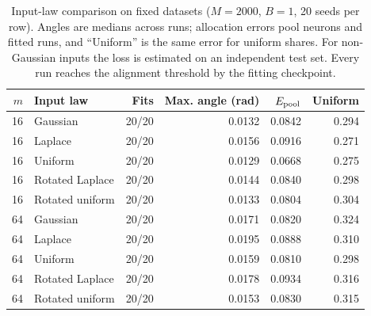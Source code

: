 \begin{table}[htbp]
\centering
\small
\setlength{\tabcolsep}{4pt}
\begin{tabular}{rlrrrr}
\toprule
$m$ & Input law & Fits & Max. angle (rad) & $E_{\rm pool}$ & Uniform \\
\midrule
16 & Gaussian & 20/20 & 0.0132 & 0.0842 & 0.294 \\
16 & Laplace & 20/20 & 0.0156 & 0.0916 & 0.271 \\
16 & Uniform & 20/20 & 0.0129 & 0.0668 & 0.275 \\
16 & Rotated Laplace & 20/20 & 0.0144 & 0.0840 & 0.298 \\
16 & Rotated uniform & 20/20 & 0.0133 & 0.0804 & 0.304 \\
64 & Gaussian & 20/20 & 0.0171 & 0.0820 & 0.324 \\
64 & Laplace & 20/20 & 0.0195 & 0.0888 & 0.310 \\
64 & Uniform & 20/20 & 0.0159 & 0.0810 & 0.298 \\
64 & Rotated Laplace & 20/20 & 0.0178 & 0.0934 & 0.316 \\
64 & Rotated uniform & 20/20 & 0.0153 & 0.0830 & 0.315 \\
\bottomrule
\end{tabular}
\caption{Input-law comparison on fixed datasets ($M=2000$, $B=1$, 20 seeds per row). Angles are medians across runs; allocation errors pool neurons and fitted runs, and ``Uniform'' is the same error for uniform shares. For non-Gaussian inputs the loss is estimated on an independent test set. Every run reaches the alignment threshold by the fitting checkpoint.}
\label{tab:h-nongaussian}
\end{table}
